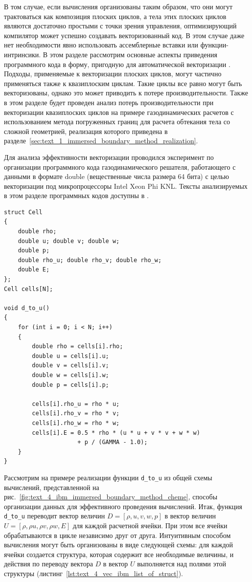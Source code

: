 В том случае, если вычисления организованы таким образом, что они могут трактоваться как композиция плоских циклов, а тела этих плоских циклов являются достаточно простыми с точки зрения управления, оптимизирующий компилятор может успешно создавать векторизованный код.
В этом случае даже нет необходимости явно использовать ассемблерные вставки или функции-интринсики.
В этом разделе рассмотрим основные аспекты приведения программного кода в форму, пригодную для автоматической векторизации \cite{Rybakov2023VecIBM}.
Подходы, применяемые к векторизации плоских циклов, могут частично применяться также к квазиплоским циклам.
Такие циклы все равно могут быть векторизованы, однако это может приводить к потере производительности.
Также в этом разделе будет проведен анализ потерь производительности при векторизации квазиплоских циклов на примере газодинамических расчетов с использованием метода погруженных границ для расчета обтекания тела со сложной геометрией, реализация которого приведена в разделе~\ref{sec:text_1_immersed_boundary_method_realization}.

Для анализа эффективности векторизации проводился эксперимент по организации программного кода газодинамического решателя, работающего с данными в формате double (вещественные числа размера 64 бита) с целью векторизации под микропроцессоры Intel Xeon Phi KNL\label{abbr:knl-7}.
Тексты анализируемых в этом разделе программных кодов доступны в \cite{ibmGithub}.

\begin{lstlisting}[caption={Организация данных в виде <<массив структур>>.},label={lst:text_4_vec_ibm_list_of_struct}]
struct Cell
{
    double rho;
    double u; double v; double w;
    double p;
    double rho_u; double rho_v; double rho_w;
    double E;
};
Cell cells[N];

void d_to_u()
{
    for (int i = 0; i < N; i++)
    {
        double rho = cells[i].rho;
        double u = cells[i].u;
        double v = cells[i].v;
        double w = cells[i].w;
        double p = cells[i].p;

        cells[i].rho_u = rho * u;
        cells[i].rho_v = rho * v;
        cells[i].rho_w = rho * w;
        cells[i].E = 0.5 * rho * (u * u + v * v + w * w)
                     + p / (GAMMA - 1.0);
    }
}
\end{lstlisting}

Рассмотрим на примере реализации функции \texttt{d\_to\_u} из общей схемы вычислений, представленной на рис.~\ref{fig:text_4_ibm_immersed_boundary_method_cheme}, способы организации данных для эффективного проведения вычислений.
Итак, функция \texttt{d\_to\_u} переводит вектор величин $D = [\rho, u, v, w, p]$ в вектор величин $U = [\rho, \rho u, \rho v, \rho w, E]$ для каждой расчетной ячейки.
При этом все ячейки обрабатываются в цикле независимо друг от друга.
Интуитивным способом вычисления могут быть организованы в виде следующей схемы: для каждой ячейки создается структура, которая содержит все необходимые величины, и действия по переводу вектора $D$ в вектор $U$ выполняется над полями этой структуры (листинг~\ref{lst:text_4_vec_ibm_list_of_struct}).

